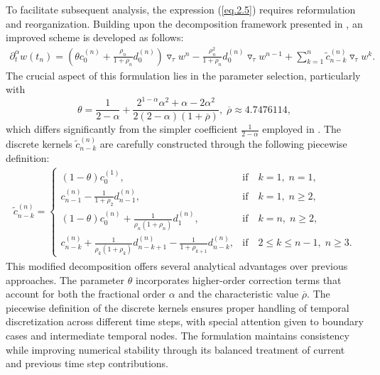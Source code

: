 \documentclass{siamart171218}
\theoremstyle{remark}
\theoremstyle{example}
\numberwithin{equation}{section}
\begin{document}
To facilitate subsequent analysis, the expression (\ref{eq.2.5}) requires reformulation and reorganization. Building upon the decomposition framework presented in \cite{Liao2024}, an improved scheme is developed as follows:
\begin{equation}\label{eq.2.7}
\begin{aligned}\displaystyle
\partial^\alpha_t w(t_{n}) =\left( \theta c_{0}^{(n)}+ \frac{\rho_{n}}{1+\rho_{n}}d_{0}^{(n)} \right) \triangledown_\tau w^{n}
-\frac{\rho_{n}^2}{1+\rho_{n}}d_{0}^{(n)} \triangledown_\tau w^{n-1} +\sum\limits_{k=1}^{n} \widetilde{c}_{n-k}^{(n)}\triangledown_\tau w^{k}.
\end{aligned}
\end{equation}
The crucial aspect of this formulation lies in the parameter selection,
particularly with $$\theta=\frac{1}{2-\alpha}+\frac{2^{1-\alpha}
\alpha^2+\alpha-2\alpha^2}{2(2-\alpha)(1+\overline{\rho})},\;\overline{\rho} \approx 4.7476114,$$ which differs significantly from the simpler coefficient $\frac{1}{2-\alpha}$ employed in \cite{Liao2024}. The discrete kernels $\widetilde{c}_{n-k}^{(n)}$ are carefully constructed through
the following piecewise definition:
\begin{equation}\label{eq.2.8}
\begin{aligned}\displaystyle
\widetilde{c}_{n-k}^{(n)}=\begin{cases}
(1-\theta)c_0^{(1)}, & \mathrm{if} \quad k=1,\;n=1, \\
c_{n-1}^{(n)}-\frac{1}{1+\rho_{2}}d_{n-1}^{(n)} , & \mathrm{if} \quad k=1,\;n\ge 2,\\
(1-\theta)c_{0}^{(n)} +\frac{1} {\rho_{n}\left(1+\rho_{n} \right)} d_{1}^{(n)} , & \mathrm{if} \quad k=n,\;n\ge 2,\\
c_{n-k}^{(n)}+\frac{1}{\rho_{k}\left(1+\rho_{k}\right) }d_{n-k+1}^{(n)} -\frac{1}{1+\rho_{k+1}}d_{n-k}^{(n)} , & \mathrm{if} \quad 2\leq k \leq n-1,\; n\ge 3.
\end{cases}
\end{aligned}
\end{equation}
This modified decomposition offers several analytical advantages over previous approaches. The parameter $\theta$ incorporates higher-order correction terms that account for both the fractional order $\alpha$ and the characteristic value $\overline{\rho}$. The piecewise definition of the discrete kernels ensures proper handling of temporal discretization across different time steps, with special attention given to boundary cases and intermediate temporal nodes. The formulation maintains consistency while improving numerical stability through its balanced treatment of current and previous time step contributions.
\end{document}
